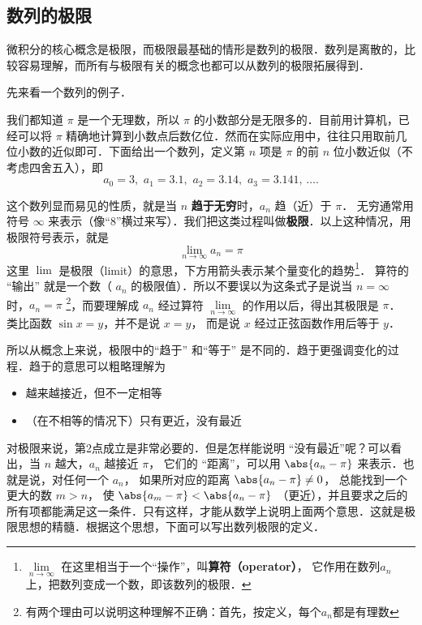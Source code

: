 
\subsection{数列的极限}

微积分的核心概念是极限，而极限最基础的情形是数列的极限．数列是离散的，比较容易理解，而所有与极限有关的概念也都可以从数列的极限拓展得到．

先来看一个数列的例子．

\begin{example}{}
我们都知道 $\pi$ 是一个无理数，所以 $\pi$ 的小数部分是无限多的．目前用计算机，已经可以将 $\pi$ 精确地计算到小数点后数亿位．然而在实际应用中，往往只用取前几位小数的近似即可．下面给出一个数列，定义第 $n$ 项是 $\pi$ 的前 $n$ 位小数近似（不考虑四舍五入），即
\begin{equation}
a_0 = 3,\,\, a_1 = 3.1,\,\, a_2 = 3.14,\,\, a_3 = 3.141,\,\dots.
\end{equation}
\end{example}

这个数列显而易见的性质，就是当 $n$ \textbf{趋于无穷}时，$a_n$ 趋（近）于 $\pi$． 无穷通常用符号 $\infty$ 来表示（像“8”横过来写）．我们把这类过程叫做\textbf{极限}．以上这种情况，用极限符号表示，就是
\begin{equation}
\lim_{n \to \infty } {a_n} = \pi 
\end{equation}
这里 $\lim$ 是极限（limit）的意思，下方用箭头表示某个量变化的趋势\footnote{$\lim\limits_{n \to \infty }$ 在这里相当于一个“操作”，叫\textbf{算符（operator）}， 它作用在数列$a_n$ 上，把数列变成一个数，即该数列的极限．}． 算符的 “输出” 就是一个数（ $a_n$ 的极限值）．所以不要误以为这条式子是说当 $n = \infty$ 时，$a_n=\pi$ \footnote{有两个理由可以说明这种理解不正确：首先，按定义，每个$a_n$都是有理数}，而要理解成 $a_n$ 经过算符 $\lim\limits_{n \to \infty }$ 的作用以后，得出其极限是 $\pi$． 类比函数 $\sin x = y$，并不是说 $x=y$， 而是说 $x$ 经过正弦函数作用后等于 $y$． 

所以从概念上来说，极限中的“趋于” 和“等于” 是不同的．趋于更强调变化的过程．趋于的意思可以粗略理解为
\begin{itemize}
\item 越来越接近，但不一定相等
\item （在不相等的情况下）只有更近，没有最近
\end{itemize}

对极限来说，第2点成立是非常必要的．但是怎样能说明 “没有最近”呢？可以看出，当 $n$ 越大，$a_n$ 越接近 $\pi$， 它们的 “距离”，可以用 $\abs{a_n - \pi}$ 来表示．也就是说，对任何一个 $a_n$， 如果所对应的距离 $\abs{a_n - \pi } \ne 0$， 总能找到一个更大的数 $m>n$， 使 $\abs{a_m - \pi} < \abs{a_n - \pi}$ （更近），并且要求之后的所有项都能满足这一条件．只有这样，才能从数学上说明上面两个意思．这就是极限思想的精髓．根据这个思想，下面可以写出数列极限的定义．


